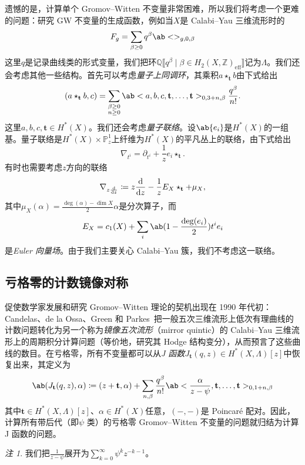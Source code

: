 \documentclass{amsart}
\theoremstyle{definition}
\theoremstyle{remark}
\newtheorem{rmk}[thm]{注}
\theoremstyle{plain}
\theoremstyle{definition}
\theoremstyle{remark}
\newcommand{\Z}{\mathbb{Z}}
\newcommand{\Q}{\mathbb{Q}}
\renewcommand{\P}{\mathbb{P}}
\newcommand{\mbf}[1]{\mathbf{#1}}
\newcommand{\mr}[1]{\mathrm{#1}}
\newcommand{\1}{\mathbf{1}}
\newcommand{\2}{\mathbf{2}}
\newcommand{\3}{\mathbf{3}}
\newcommand{\ps}[1]{\llbracket #1 \rrbracket}
\begin{document}
遗憾的是，计算单个 Gromov--Witten 不变量非常困难，所以我们将考虑一个更难的问题：研究 GW 不变量的生成函数，例如当\(X\)是 Calabi--Yau 三维流形时的
\[ F_g = \sum_{\beta \geq 0} q^{\beta} \ab<>_{g,0,\beta} \]
这里\(q\)是记录曲线类的形式变量，我们把环\(\Q\ps{q^{\beta} \mid \beta \in H_2(X, \Z)_{\mr{eff}}}\)记为\(\Lambda\)。我们还会考虑其他一些结构。首先可以考虑\textit{量子上同调环}，其乘积\(a \star_{\mbf{t}} b\)由下式给出
\[
    (a \star_{\mbf{t}} b, c) = \sum_{\substack{\beta \geq 0 \\ n \geq 0}} \ab<a,b,c, \mbf{t}, \ldots, \mbf{t}>_{0,3+n,\beta} \frac{q^{\beta}}{n!}.
\]
这里\(a,b,c, \mbf{t} \in H^*(X)\)。我们还会考虑\textit{量子联络}。设\(\ab\{ e_i \}\)是\(H^*(X)\)的一组基。量子联络是\(H^*(X) \times \P^1_z\)上纤维为\(H^*(X)\)的平凡丛上的联络，由下式给出
\[ \nabla_{t^i} = \partial_{t^i} + \frac{1}{z} e_i \star_{\mbf{t}}. \]
有时也需要考虑\(z\)方向的联络
\[ \nabla_{z \odv{}{z}} \coloneqq z \odv{}{z} - \frac{1}{z} E_X \star_{\mbf{t}} + \mu_X, \]
其中\(\mu_X(\alpha) = \frac{\deg(\alpha) - \dim X}{2} \alpha\)是分次算子，而
\[ E_X = c_1(X) + \sum_i \ab(1 - \frac{\deg(e_i)}{2})t^i e_i \]
是\textit{Euler 向量场}。由于我们主要关心 Calabi--Yau 簇，我们不考虑这一联络。

\subsection{亏格零的计数镜像对称}%
\label{sub:Enumerative mirror symmetry in genus zero}

促使数学家发展和研究 Gromov--Witten 理论的契机出现在 1990 年代初：Candelas、de la Ossa、Green 和 Parkes~\cite{CandelasEtAl1991}把一般五次三维流形上低次有理曲线的计数问题转化为另一个称为\textit{镜像五次流形}（mirror quintic）的 Calabi--Yau 三维流形上的周期积分计算问题（等价地，研究其 Hodge 结构变分），从而预言了这些曲线的数目。在亏格零，所有不变量都可以从\textit{J 函数}\(J_{\mbf{t}}(q,z) \in H^*(X, \Lambda)[z]\)中恢复出来，其定义为
\[ \ab( J_{\mbf{t}}(q, z), \alpha ) \coloneqq (z + \mbf{t}, \alpha) + \sum_{n, \beta} \frac{q^{\beta}}{n!} \ab< \frac{\alpha}{z-\psi}, \mbf{t}, \ldots, \mbf{t}>_{0,1+n, \beta} \]
其中\(\mbf{t} \in H^*(X, \Lambda)[z]\)、\(\alpha \in H^*(X)\)任意，\((-,-)\)是 Poincar\'e 配对。因此，计算所有带后代（即\(\psi\) 类）的亏格零 Gromov--Witten 不变量的问题就归结为计算J 函数的问题。

\begin{rmk}
    我们把\(\frac{1}{z-\psi}\)展开为\(\sum_{k=0}^{\infty} \psi^k z^{-k-1}\)。
\end{rmk}
\end{document}
